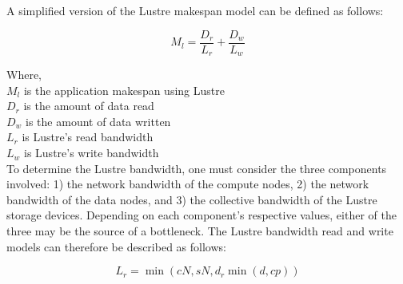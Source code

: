 \documentclass[10pt,journal,compsoc]{IEEEtran}
\begin{document}
      A simplified version of the Lustre makespan model can be defined as
      follows:

      \begin{equation}\label{eq:sea-comp:lustrenpc}
          M_{l} =  \frac{D_{r}}{L_{r}} + \frac{D_{w}}{L_{w}}
      \end{equation}

      {\noindent} Where, \\
      $M_{l}$ is the application makespan using Lustre \\
      $D_{r}$ is the amount of data read \\
      $D_{w}$ is the amount of data written \\
      $L_{r}$ is Lustre's read bandwidth \\
      $L_{w}$ is Lustre's write bandwidth \\



      To determine the Lustre bandwidth, one must consider the three components
  involved: 1) the network bandwidth of the compute nodes, 2) the network
  bandwidth of the data nodes, and 3) the collective bandwidth of the Lustre
  storage devices. Depending on each component's respective values, either of
  the three may be the source of a bottleneck. The Lustre bandwidth read and
  write models can therefore be described as follows:

    \begin{equation} %
        L_{r} = \min{(cN, sN, d_{r}\min{(d, cp)})}
    \end{equation}
\end{document}
